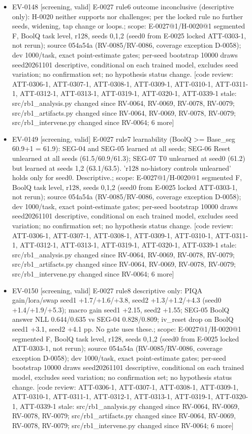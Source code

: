 \documentclass[11pt]{article}
\begin{document}
\begin{itemize}
\item EV-0148 [screening, valid] E-0027 rule6 outcome inconclusive (descriptive only): H-0020 neither supports nor challenges; per the locked rule no further seeds, widening, tap change or loops.; scope: E-0027@1/H-0020@1 segmented F, BoolQ task level, r128, seeds 0,1,2 (seed0 from E-0025 locked ATT-0303-1, not rerun); source 054a54a (RV-0085/RV-0086, coverage exception D-0058); dev 1000/task, exact point-estimate gates; per-seed bootstrap 10000 draws seed20261101 descriptive, conditional on each trained model, excludes seed variation; no confirmation set; no hypothesis status change. [code review: ATT-0306-1, ATT-0307-1, ATT-0308-1, ATT-0309-1, ATT-0310-1, ATT-0311-1, ATT-0312-1, ATT-0313-1, ATT-0319-1, ATT-0320-1, ATT-0339-1 stale: src/rb1\_analysis.py changed since RV-0064, RV-0069, RV-0078, RV-0079; src/rb1\_artifacts.py changed since RV-0064, RV-0069, RV-0078, RV-0079; src/rb1\_intervene.py changed since RV-0064; 6 more]
\item EV-0149 [screening, valid] E-0027 rule7 learnability (BoolQ \textgreater{}= Base\_seg 60.9+1 = 61.9): SEG-04 and SEG-05 learned at all seeds; SEG-06 Reset unlearned at all seeds (61.5/60.9/61.3); SEG-07 T0 unlearned at seed0 (61.2) but learned at seeds 1,2 (63.1/63.5). 'r128 no-history controls unlearned' holds only for seed0. Descriptive.; scope: E-0027@1/H-0020@1 segmented F, BoolQ task level, r128, seeds 0,1,2 (seed0 from E-0025 locked ATT-0303-1, not rerun); source 054a54a (RV-0085/RV-0086, coverage exception D-0058); dev 1000/task, exact point-estimate gates; per-seed bootstrap 10000 draws seed20261101 descriptive, conditional on each trained model, excludes seed variation; no confirmation set; no hypothesis status change. [code review: ATT-0306-1, ATT-0307-1, ATT-0308-1, ATT-0309-1, ATT-0310-1, ATT-0311-1, ATT-0312-1, ATT-0313-1, ATT-0319-1, ATT-0320-1, ATT-0339-1 stale: src/rb1\_analysis.py changed since RV-0064, RV-0069, RV-0078, RV-0079; src/rb1\_artifacts.py changed since RV-0064, RV-0069, RV-0078, RV-0079; src/rb1\_intervene.py changed since RV-0064; 6 more]
\item EV-0150 [screening, valid] E-0027 rule8 descriptive only: PIQA gain/lora/swap seed1 +1.7/+1.6/+3.8, seed2 +1.3/+1.2/+4.3 (seed0 +1.4/+1.9/+5.3); macro gain seed1 +2.15, seed2 +1.55; SEG-05 BoolQ answer NLL 0.644/0.635 vs SEG-04 0.828/0.809; iv\_reset drop on BoolQ seed1 +3.1, seed2 +4.1 pp. No gate uses these.; scope: E-0027@1/H-0020@1 segmented F, BoolQ task level, r128, seeds 0,1,2 (seed0 from E-0025 locked ATT-0303-1, not rerun); source 054a54a (RV-0085/RV-0086, coverage exception D-0058); dev 1000/task, exact point-estimate gates; per-seed bootstrap 10000 draws seed20261101 descriptive, conditional on each trained model, excludes seed variation; no confirmation set; no hypothesis status change. [code review: ATT-0306-1, ATT-0307-1, ATT-0308-1, ATT-0309-1, ATT-0310-1, ATT-0311-1, ATT-0312-1, ATT-0313-1, ATT-0319-1, ATT-0320-1, ATT-0339-1 stale: src/rb1\_analysis.py changed since RV-0064, RV-0069, RV-0078, RV-0079; src/rb1\_artifacts.py changed since RV-0064, RV-0069, RV-0078, RV-0079; src/rb1\_intervene.py changed since RV-0064; 6 more]

\end{itemize}
\end{document}
